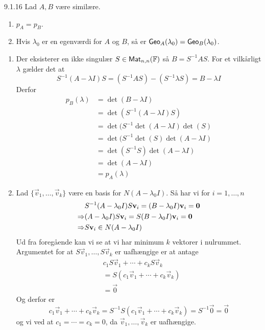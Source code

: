 \begin{lemma}{9.1.16}
	Lad $A, B$ være similære.
	\begin{enumerate}[1.]
		\item $\mathit{p}_A = \mathit{p}_B$.
		\item Hvis $\lambda_0$ er en egenværdi for $A$ og $B$, så er 
			$\textsf{Geo}_{A}(\lambda_0) = \textsf{Geo}_{B}(\lambda_0)$.
	\end{enumerate}
\end{lemma}

\begin{bevis}
	\begin{enumerate}[1.]
		\item Der eksisterer en ikke singulær $S \in \textsf{Mat}_{n,n}(\mathbb{F})$
			så $B = S^{-1}AS$. For et vilkårligt $\lambda$ gælder det at
			\[
				S^{-1}(A- \lambda I)S = (S^{-1}AS) - (S^{-1}\lambda S) = B - \lambda I
			\]
			Derfor
			\begin{align*}
				\mathit{p}_B(\lambda) &= \det(B-\lambda I)\\
				&= \det(S^{-1}(A-\lambda I)S)\\
				&= \det(S^{-1}\det(A-\lambda I)\det(S)\\
				&= \det(S^{-1}\det(S)\det(A - \lambda I)\\
				&= \det(S^{-1}S)\det(A - \lambda I)\\
				&= \det(A - \lambda I)\\
				&= \mathit{p}_A(\lambda)
			\end{align*}
		\item Lad $\{\vec{v}_1, \dotsc, \vec{v}_k\}$ være en basis for 
		$N(A-\lambda_0I)$. Så har vi for $i = 1,\dotsc,n$
		\begin{align*}
			&S^{-1}(A-\lambda_0I)S\mathbf{v}_i = (B-\lambda_0I)\mathbf{v}_i = \mathbf{0}\\
			\Rightarrow &(A-\lambda_0I)S\mathbf{v}_i = S(B-\lambda_0I)\mathbf{v}_i =  \mathbf{0}\\
			\Rightarrow & S\mathbf{v}_i \in N(A-\lambda_0I)
		\end{align*}
		Ud fra foregående kan vi se at vi har minimum $k$ vektorer i nulrummet.
		Argumentet for at $S\vec{v}_1,\dotsc,S\vec{v}_k$ er uafhængige er at 
		antage
		\begin{align*}
			&c_1S\vec{v}_1 + \dotsb + c_kS\vec{v}_k\\
			&= S(c_1\vec{v}_1 + \dotsb + c_k\vec{v}_k)\\
			&= \vec{0}
		\end{align*}
		Og derfor er
		\[
			c_1\vec{v}_1 + \dotsb + c_k\vec{v}_k =
			S^{-1}S(c_1\vec{v}_1 + \dotsb + c_k\vec{v}_k) =
			S^{-1}\vec{0} =
			\vec{0}
		\]
		og vi ved at $c_1= \dotsb =c_k = 0$, da $\vec{v}_1, \dotsc, \vec{v}_k$
		er uafhængige.


\end{enumerate}
\end{bevis}
